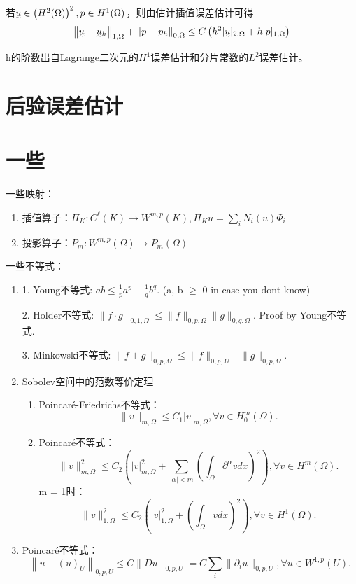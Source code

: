 若$\undertilde{u} \in\left(H^{2}(\Omega)\right)^{2}, p \in H^{1}(\Omega)$，则由估计插值误差估计可得
\[
  \left\|\undertilde{u}-\undertilde{u}_{h}\right\|_{1, \Omega}+\left\|p-p_{h}\right\|_{0, \Omega} \leq C\left(h^{2}|\undertilde{u}|_{2, \Omega}+h|p|_{1, \Omega}\right)
\]

h的阶数出自Lagrange二次元的$H^1$误差估计和分片常数的$L^2$误差估计。

\section{后验误差估计}

\newpage

\section{一些}
一些映射：
\begin{enumerate}
  \item 插值算子：$\Pi_K: C^\ell(K) \to W^{m, p}(K), \Pi_K u = \sum_i N_i(u) \Phi_i$
  \item 投影算子：$P_m: W^{m, p}(\Omega) \to P_m(\Omega)$
\end{enumerate}

一些不等式：
\begin{enumerate}
  \item 1. Young不等式: $a b \le \frac{1}{p} a^{p}+\frac{1}{q} b^{q}$. (a, b $\ge$ 0 in case you dont know)

  2. Holder不等式: $\|f \cdot g\|_{0, 1, \Omega} \le\|f\|_{0, p, \Omega}\|g\|_{0, q, \Omega}$. Proof by Young不等式.
  
  3. Minkowski不等式: $\|f+g\|_{0, p, \Omega} \le\|f\|_{0, p, \Omega}+\|g\|_{0, p, \Omega}$.
  \item Sobolev空间中的范数等价定理
  \begin{enumerate}
    \item Poincaré-Friedrichs不等式：
    \[
      \|v\|_{m, \Omega} \le C_{1}|v|_{m, \Omega}, \forall v \in H_{0}^{m}(\Omega).
    \]
    \item Poincaré不等式：
    \[
      \|v\|_{m, \Omega}^{2} \le C_{2}\left(|v|_{m, \Omega}^{2}+\sum_{|\alpha|<m}\left(\int_{\Omega} \partial^{\alpha} v dx\right)^{2}\right), \forall v \in H^{m}(\Omega).
    \]
    m = 1时：
    \[
      \|v\|_{1, \Omega}^{2} \le C_{2}\left(|v|_{1, \Omega}^{2}+\left(\int_{\Omega} v dx\right)^{2}\right), \forall v \in H^{1}(\Omega).
    \]
  \end{enumerate}
  \item Poincaré不等式：
  \[
    \left\|u-(u)_{U}\right\|_{0, p, U} \le C\|D u\|_{0, p, U} = C\sum_{i} \|\partial_i u\|_{0, p, U}, \forall u \in W^{1, p}(U).
  \]
\end{enumerate}

